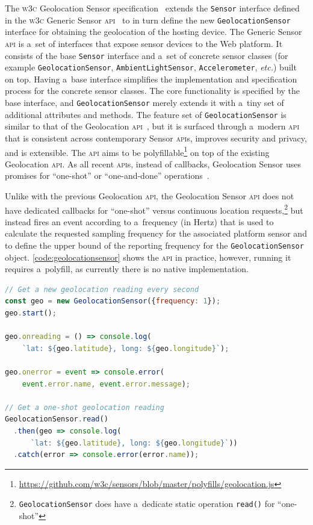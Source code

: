 \documentclass[sigconf,hyphens]{acmart}
\begin{document}
The \textsc{w3c} Geolocation Sensor specification~\cite{kostiainen2018geolocation}
extends the \texttt{Sensor} interface defined in the
\textsc{w3c} Generic Sensor \textsc{api}~\cite{waldron2018genericsensor}
to in turn define the new \texttt{GeolocationSensor} interface
for obtaining the geolocation of the hosting device.
The Generic Sensor \textsc{api} is a~set of interfaces that expose sensor devices to the Web
platform. It consists of the base \texttt{Sensor} interface and a~set of concrete sensor classes
(for example \texttt{GeolocationSensor}, \texttt{AmbientLightSensor}, \texttt{Accelerometer},
\textit{etc.}) built on top.
Having a~base interface simplifies the implementation and specification process for the concrete
sensor classes. The core functionality is specified by the base interface, and
\texttt{GeolocationSensor} merely extends it with a~tiny set of additional attributes and methods.
The feature set of \texttt{GeolocationSensor} is similar
to that of the Geolocation \textsc{api}~\cite{raskin2010geolocation},
but it is surfaced through a~modern \textsc{api} that is consistent across contemporary Sensor
\textsc{api}s, improves security and privacy, and is extensible.
The \textsc{api} aims to be
polyfillable\footnote{\url{https://github.com/w3c/sensors/blob/master/polyfills/geolocation.js}}
on top of the existing Geolocation \textsc{api}.
As all recent \textsc{api}s, instead of callbacks, Geolocation Sensor
uses promises for ``one-shot'' or ``one-and-done''
operations~\cite{denicola2018tag}.

Unlike with the previous Geolocation \textsc{api}, the Geolocation Sensor \textsc{api}
does not have dedicated callbacks for
``one-shot'' versus continuous location
requests,\footnote{\texttt{GeolocationSensor} does have a~dedicate static operation
\texttt{read()} for ``one-shot''}
but instead fires an event according to a~frequency (in Hertz) that is used
to calculate the requested sampling frequency for the associated platform sensor
and to define the upper bound of the reporting frequency for the \texttt{GeolocationSensor}
object.
\autoref{code:geolocationsensor} shows the \textsc{api} in practice,
however, running it requires a~polyfill, as currently there is no native implementation.

\begin{lstlisting}[caption={Geolocation Sensor \textsc{api}},
  label=code:geolocationsensor, language=JavaScript, float=t] 
// Get a new geolocation reading every second
const geo = new GeolocationSensor({frequency: 1});
geo.start();

geo.onreading = () => console.log(
    `lat: ${geo.latitude}, long: ${geo.longitude}`);

geo.onerror = event => console.error(
    event.error.name, event.error.message);

// Get a one-shot geolocation reading
GeolocationSensor.read()
  .then(geo => console.log(
      `lat: ${geo.latitude}, long: ${geo.longitude}`))
  .catch(error => console.error(error.name));
\end{lstlisting}
\end{document}
